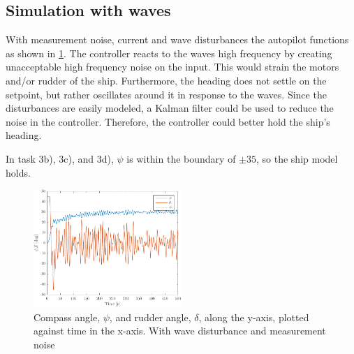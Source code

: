 \subsection{Simulation with waves}
With measurement noise, current and wave disturbances the autopilot functions as shown in \cref{fig:3b-psi_and_rudder_w_waves}. The controller reacts to the waves high frequency by creating unacceptable high frequency noise on the input. This would strain the motors and/or rudder of the ship. Furthermore, the heading does not settle on the setpoint, but rather oscillates around it in response to the waves. Since the disturbances are easily modeled, a Kalman filter could be used to reduce the noise in the controller. Therefore, the controller could better hold the ship's heading.

In task 3b), 3c), and 3d), $\psi$ is within the boundary of $\pm35$, so the ship model holds.

\begin{figure}[ht!]
    \centering
    \includegraphics[width=0.5\textwidth]{images/3d-psi_and_rudder_w_waves}
    \caption{Compass angle, $\psi$, and rudder angle, $\delta$, along the y-axis, plotted against time in the x-axis. With wave disturbance and measurement noise}
    \label{fig:3b-psi_and_rudder_w_waves}
\end{figure}